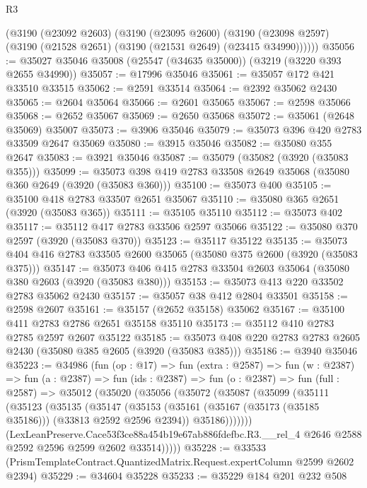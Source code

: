 \begin{lexlean}{R3}
\begin{coremodule}
    (@3190
      (@23092 @2603)
      (@3190
        (@23095 @2600)
        (@3190 (@23098 @2597) (@3190 (@21528 @2651) (@3190 (@21531 @2649) (@23415 @34990))))))
@35056 := @35027 @35046 @35008 (@25547 (@34635 @35000)) (@3219 (@3220 @393 @2655 @34990))
@35057 := @17996 @35046
@35061 := @35057 @172 @421 @33510 @33515
@35062 := @2591 @33514
@35064 := @2392 @35062 @2430
@35065 := @2604 @35064
@35066 := @2601 @35065
@35067 := @2598 @35066
@35068 := @2652 @35067
@35069 := @2650 @35068
@35072 := @35061 (@2648 @35069) @35007
@35073 := @3906 @35046
@35079 := @35073 @396 @420 @2783 @33509 @2647 @35069
@35080 := @3915 @35046
@35082 := @35080 @355 @2647
@35083 := @3921 @35046
@35087 := @35079 (@35082 (@3920 (@35083 @355)))
@35099 := @35073 @398 @419 @2783 @33508 @2649 @35068 (@35080 @360 @2649 (@3920 (@35083 @360)))
@35100 := @35073 @400
@35105 := @35100 @418 @2783 @33507 @2651 @35067
@35110 := @35080 @365 @2651 (@3920 (@35083 @365))
@35111 := @35105 @35110
@35112 := @35073 @402
@35117 := @35112 @417 @2783 @33506 @2597 @35066
@35122 := @35080 @370 @2597 (@3920 (@35083 @370))
@35123 := @35117 @35122
@35135 := @35073 @404 @416 @2783 @33505 @2600 @35065 (@35080 @375 @2600 (@3920 (@35083 @375)))
@35147 := @35073 @406 @415 @2783 @33504 @2603 @35064 (@35080 @380 @2603 (@3920 (@35083 @380)))
@35153 := @35073 @413 @220 @33502 @2783 @35062 @2430
@35157 := @35057 @38 @412 @2804 @33501
@35158 := @2598 @2607
@35161 := @35157 (@2652 @35158) @35062
@35167 := @35100 @411 @2783 @2786 @2651 @35158 @35110
@35173 := @35112 @410 @2783 @2785 @2597 @2607 @35122
@35185 := @35073 @408 @220 @2783 @2783 @2605 @2430 (@35080 @385 @2605 (@3920 (@35083 @385)))
@35186 := @3940 @35046
@35223 := @34986
    (fun (op : @17) =>
    fun (extra : @2587) =>
    fun (w : @2387) =>
    fun (a : @2387) =>
    fun (ids : @2387) =>
    fun (o : @2387) =>
    fun (full : @2587) =>
    @35012
      (@35020
        (@35056
          (@35072
            (@35087
              (@35099
                (@35111
                  (@35123
                    (@35135
                      (@35147
                        (@35153
                          (@35161 (@35167 (@35173 (@35185 @35186))) (@33813 @2592 @2596 @2394))
                          @35186)))))))
            (LexLeanPreserve.Cace53f3ce88a454b19e67ab886fdefbc.R3.__rel_4
              @2646
              @2588
              @2592
              @2596
              @2599
              @2602
              @33514)))))
@35228 := @33533 (PrismTemplateContract.QuantizedMatrix.Request.expertColumn @2599 @2602 @2394)
@35229 := @34604 @35228
@35233 := @35229 @184 @201 @232 @508

\end{coremodule}
\end{lexlean}
